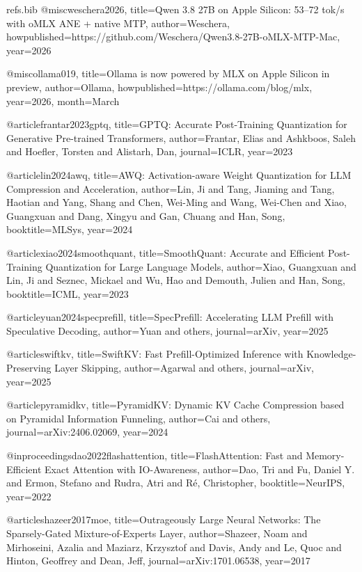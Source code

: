 \begin{filecontents*}[overwrite]{refs.bib}
@misc{weschera2026,
  title={{Qwen} 3.8 27{B} on {Apple} Silicon: 53--72 tok/s with {oMLX} {ANE} + native {MTP}},
  author={Weschera},
  howpublished={https://github.com/Weschera/Qwen3.8-27B-oMLX-MTP-Mac},
  year={2026}
}

@misc{ollama019,
  title={{Ollama} is now powered by {MLX} on {Apple} Silicon in preview},
  author={{Ollama}},
  howpublished={https://ollama.com/blog/mlx},
  year={2026},
  month={March}
}

@article{frantar2023gptq,
  title={{GPTQ}: Accurate Post-Training Quantization for Generative Pre-trained Transformers},
  author={Frantar, Elias and Ashkboos, Saleh and Hoefler, Torsten and Alistarh, Dan},
  journal={ICLR},
  year={2023}
}

@article{lin2024awq,
  title={{AWQ}: Activation-aware Weight Quantization for {LLM} Compression and Acceleration},
  author={Lin, Ji and Tang, Jiaming and Tang, Haotian and Yang, Shang and Chen, Wei-Ming and Wang, Wei-Chen and Xiao, Guangxuan and Dang, Xingyu and Gan, Chuang and Han, Song},
  booktitle={MLSys},
  year={2024}
}

@article{xiao2024smoothquant,
  title={{SmoothQuant}: Accurate and Efficient Post-Training Quantization for Large Language Models},
  author={Xiao, Guangxuan and Lin, Ji and Seznec, Mickael and Wu, Hao and Demouth, Julien and Han, Song},
  booktitle={ICML},
  year={2023}
}

@article{yuan2024specprefill,
  title={{SpecPrefill}: Accelerating {LLM} Prefill with Speculative Decoding},
  author={Yuan and others},
  journal={arXiv},
  year={2025}
}

@article{swiftkv,
  title={{SwiftKV}: Fast Prefill-Optimized Inference with Knowledge-Preserving Layer Skipping},
  author={Agarwal and others},
  journal={arXiv},
  year={2025}
}

@article{pyramidkv,
  title={{PyramidKV}: Dynamic {KV} Cache Compression based on Pyramidal Information Funneling},
  author={Cai and others},
  journal={arXiv:2406.02069},
  year={2024}
}

@inproceedings{dao2022flashattention,
  title={{FlashAttention}: Fast and Memory-Efficient Exact Attention with {IO}-Awareness},
  author={Dao, Tri and Fu, Daniel Y. and Ermon, Stefano and Rudra, Atri and R{\'e}, Christopher},
  booktitle={NeurIPS},
  year={2022}
}

@article{shazeer2017moe,
  title={Outrageously Large Neural Networks: The Sparsely-Gated Mixture-of-Experts Layer},
  author={Shazeer, Noam and Mirhoseini, Azalia and Maziarz, Krzysztof and Davis, Andy and Le, Quoc and Hinton, Geoffrey and Dean, Jeff},
  journal={arXiv:1701.06538},
  year={2017}
}


\end{filecontents*}
